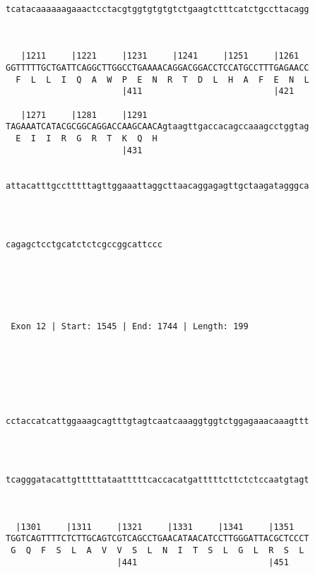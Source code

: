 \documentclass{article}
\begin{document}
\begin{Verbatim}
                                                            
tcatacaaaaaagaaactcctacgtggtgtgtgtctgaagtctttcatctgccttacagg
                                                            
                                                            
   
   |1211     |1221     |1231     |1241     |1251     |1261  
GGTTTTTGCTGATTCAGGCTTGGCCTGAAAACAGGACGGACCTCCATGCCTTTGAGAACC
  F  L  L  I  Q  A  W  P  E  N  R  T  D  L  H  A  F  E  N  L
                       |411                          |421   
   
   |1271     |1281     |1291                                
TAGAAATCATACGCGGCAGGACCAAGCAACAgtaagttgaccacagccaaagcctggtag
  E  I  I  R  G  R  T  K  Q  H                              
                       |431                                 
   
                                                            
attacatttgcctttttagttggaaattaggcttaacaggagagttgctaagatagggca
                                                            
                                                            
   
                               
cagagctcctgcatctctcgccggcattccc
                               
                               
  



 Exon 12 | Start: 1545 | End: 1744 | Length: 199 





   
                                                            
cctaccatcattggaaagcagtttgtagtcaatcaaaggtggtctggagaaacaaagttt
                                                            
                                                            
   
                                                            
tcagggatacattgtttttataatttttcaccacatgatttttcttctctccaatgtagt
                                                            
                                                            
   
  |1301     |1311     |1321     |1331     |1341     |1351   
TGGTCAGTTTTCTCTTGCAGTCGTCAGCCTGAACATAACATCCTTGGGATTACGCTCCCT
 G  Q  F  S  L  A  V  V  S  L  N  I  T  S  L  G  L  R  S  L 
                      |441                          |451    
   

\end{Verbatim}
\end{document}

